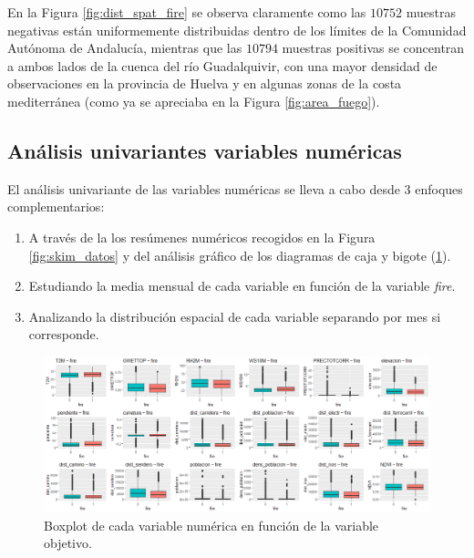 \documentclass[12pt,a4paper,]{book}
\numberwithin{dummy}{section}
\theoremstyle{ocrenumbox}
\theoremstyle{blacknumex}
\theoremstyle{blacknumbox}
\theoremstyle{ocrenum}
\theoremstyle{ocrenum}
\begin{document}
En la Figura \ref{fig:dist_spat_fire} se observa claramente como las
\(10752\) muestras negativas están uniformemente distribuidas dentro de
los límites de la Comunidad Autónoma de Andalucía, mientras que las
\(10794\) muestras positivas se concentran a ambos lados de la cuenca
del río Guadalquivir, con una mayor densidad de observaciones en la
provincia de Huelva y en algunas zonas de la costa mediterránea (como ya
se apreciaba en la Figura \ref{fig:area_fuego}).

\hypertarget{anuxe1lisis-univariantes-variables-numuxe9ricas}{%
\subsection{Análisis univariantes variables
numéricas}\label{anuxe1lisis-univariantes-variables-numuxe9ricas}}

El análisis univariante de las variables numéricas se lleva a cabo desde
3 enfoques complementarios:

\begin{enumerate}
\def\labelenumi{\arabic{enumi}.}
\item
  A través de la los resúmenes numéricos recogidos en la Figura
  \ref{fig:skim_datos} y del análisis gráfico de los diagramas de caja y
  bigote (\ref{fig:boxplots}).
\item
  Estudiando la media mensual de cada variable en función de la variable
  \emph{fire}.
\item
  Analizando la distribución espacial de cada variable separando por mes
  si corresponde.
\end{enumerate}

\begin{figure}[]
\centering
\includegraphics[width =\textwidth]{graficos/boxplots.png}
\caption{Boxplot de cada variable numérica en función de la variable objetivo.}
\label{fig:boxplots}
\end{figure}
\end{document}
